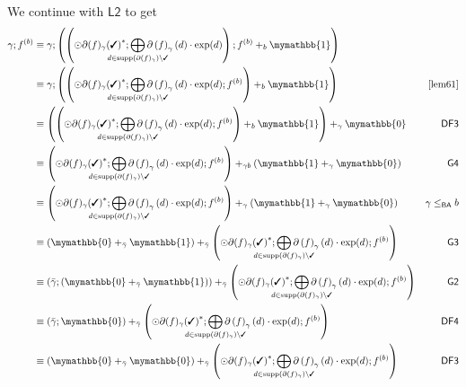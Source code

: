 \documentclass[a4paper,UKenglish,cleveref, autoref, thm-restate]{lipics-v2021}
\newcommand{\cmark}{\text{\ding{51}}}
\newcommand{\BA}{\textsf{BA}}
\newcommand{\ex}{\text{\upshape{exp}}}
\newcommand{\Ax}[1]{\ensuremath{\mathsf{#1}}}
\newcommand{\bskip}{\mymathbb{1}}
\newcommand{\babort}{\mymathbb{0}}
\theoremstyle{plain}\newtheoremrep{thm}{Theorem}[section]
\begin{document}
\begin{appendixproof}
\begin{align*}
	\end{align*}
	We continue with \Ax{L2} to get
	\begin{align*}
		\gamma;f^{(b)} &\equiv \gamma;\left(\left(\odot{\partial(f)_\gamma(\cmark)}^*;\bigoplus_{\mathclap{\substack{d \in \text{supp}(\partial(f)_\gamma)\setminus \cmark}}}\partial\left(f\right)_\gamma(d)\cdot\ex(d)\right);f^{(b)}+_b \bskip\right)\\
		&\equiv \gamma;\left(\left(\odot{\partial(f)_\gamma(\cmark)}^*;\bigoplus_{\mathclap{\substack{d \in \text{supp}(\partial(f)_\gamma)\setminus \cmark}}}\partial\left(f\right)_\gamma(d)\cdot\ex(d);f^{(b)}\right)+_b \bskip\right)&\cref{lem61}\\
		&\equiv \left(\left(\odot 	{\partial(f)_\gamma(\cmark)}^*;\bigoplus_{\mathclap{\substack{d \in \text{supp}(\partial(f)_\gamma)\setminus \cmark}}}\partial\left(f\right)_\gamma(d)\cdot\ex(d);f^{(b)}\right)+_b \bskip\right)+_\gamma \babort&\Ax{DF3}\\
		&\equiv \left(\odot 	{\partial(f)_\gamma(\cmark)}^*;\bigoplus_{\mathclap{\substack{d \in \text{supp}(\partial(f)_\gamma)\setminus \cmark}}}\partial\left(f\right)_\gamma(d)\cdot\ex(d);f^{(b)}\right)+_{\gamma b} (\bskip +_\gamma \babort)&\Ax{G4}\\
		&\equiv \left(\odot 	{\partial(f)_\gamma(\cmark)}^*;\bigoplus_{\mathclap{\substack{d \in \text{supp}(\partial(f)_\gamma)\setminus \cmark}}}\partial\left(f\right)_\gamma(d)\cdot\ex(d);f^{(b)}\right)+_{\gamma} (\bskip +_\gamma \babort)&\gamma \leq_{\BA} b\\
		&\equiv (\babort +_{\bar\gamma} \bskip) +_{\bar\gamma} \left(\odot {\partial(f)_\gamma(\cmark)}^*;\bigoplus_{\mathclap{\substack{d \in \text{supp}(\partial(f)_\gamma)\setminus \cmark}}}\partial\left(f\right)_\gamma(d)\cdot\ex(d);f^{(b)}\right)&\Ax{G3}\\
		&\equiv (\bar\gamma;(\babort +_{\bar\gamma} \bskip))+_{\bar\gamma} \left(\odot {\partial(f)_\gamma(\cmark)}^*;\bigoplus_{\mathclap{\substack{d \in \text{supp}(\partial(f)_\gamma)\setminus \cmark}}}\partial\left(f\right)_\gamma(d)\cdot\ex(d);f^{(b)}\right)&\Ax{G2}\\
		&\equiv (\bar\gamma;\babort) +_{\bar\gamma} \left(\odot {\partial(f)_\gamma(\cmark)}^*;\bigoplus_{\mathclap{\substack{d \in \text{supp}(\partial(f)_\gamma)\setminus \cmark}}}\partial\left(f\right)_\gamma(d)\cdot\ex(d);f^{(b)}\right)&\Ax{DF4}\\
		&\equiv (\babort+_{\bar\gamma} \babort) +_{\bar\gamma} \left(\odot {\partial(f)_\gamma(\cmark)}^*;\bigoplus_{\mathclap{\substack{d \in \text{supp}(\partial(f)_\gamma)\setminus \cmark}}}\partial\left(f\right)_\gamma(d)\cdot\ex(d);f^{(b)}\right)&\Ax{DF3}\\

\end{align*}
\end{appendixproof}
\end{document}
